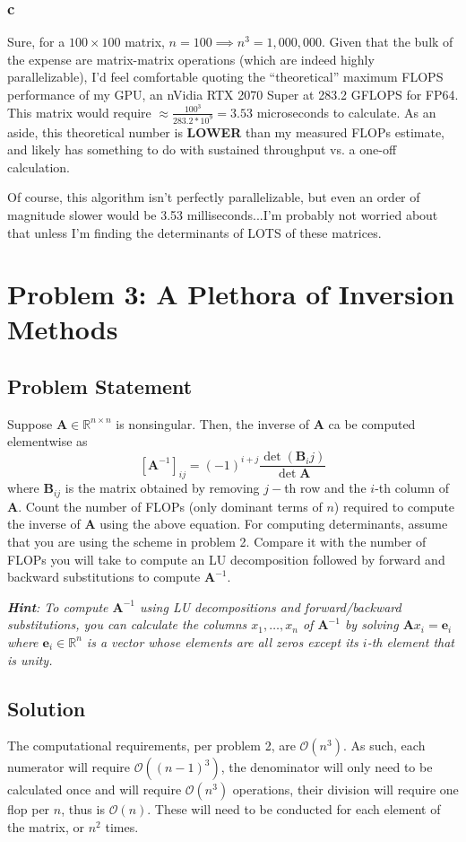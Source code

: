 \documentclass[11pt]{report}
\theoremstyle{definition}
\newcommand{\mat}[1]{\mathbf{#1}}
\begin{document}
\subsubsection*{c}
Sure, for a $100\times100$ matrix, $n=100\implies n^3=1,000,000$. Given that the
bulk of the expense are matrix-matrix operations (which are indeed highly
parallelizable), I'd feel comfortable quoting the ``theoretical'' maximum FLOPS
performance of my GPU, an nVidia RTX 2070 Super at 283.2 GFLOPS for FP64.  This
matrix would require $\approx \frac{100^3}{283.2*10^9}=3.53$ microseconds to
calculate. As an aside, this theoretical number is \textbf{LOWER} than my
measured FLOPs estimate, and likely has something to do with sustained
throughput vs. a one-off calculation.

Of course, this algorithm isn't perfectly parallelizable, but even an order of
magnitude slower would be 3.53 milliseconds...I'm probably not worried about
that unless I'm finding the determinants of LOTS of these matrices.

\newpage
\section*{Problem 3: A Plethora of Inversion Methods}
\subsection*{Problem Statement}
Suppose $\mat{A}\in\mathbb{R}^{n\times n}$ is nonsingular. Then, the inverse of
$\mat{A}$ ca be computed elementwise as
\[ \left[\mat{A}^{-1}\right]_{ij} = (-1)^{i+j}\frac{\det(\mat{B}_ij)}{\det{\mat{A}}} \]
where $\mat{B}_{ij}$ is the matrix obtained by removing $j-$th row and the
$i$-th column of $\mat{A}$. Count the number of FLOPs (only dominant terms of
$n$) required to compute the inverse of $\mat{A}$ using the above equation. For
computing determinants, assume that you are using the scheme in problem 2.
Compare it with the number of FLOPs you will take to compute an LU decomposition
followed by forward and backward substitutions to compute $\mat{A}^{-1}$.

\textit{
	\textbf{Hint}: To compute $\mat{A}^{-1}$ using LU decompositions and
	forward/backward substitutions, you can calculate the columns $x_1,\ldots,x_n$
	of $\mat{A}^{-1}$ by solving $\mat{A}x_i=\mat{e}_i$ where $\mat{e}_i\in\mathbb{R}^n$
	is a vector whose elements are all zeros except its $i$-th element that is unity.
}

\subsection*{Solution}
The computational requirements, per problem 2, are $\mathcal{O}(n^3)$. As such,
each numerator will require $\mathcal{O}((n-1)^3)$, the denominator will only
need to be calculated once and will require $\mathcal{O}(n^3)$ operations, their
division will require one flop per $n$, thus is $\mathcal{O}(n)$. These will
need to be conducted for each element of the matrix, or $n^2$ times.
\end{document}
